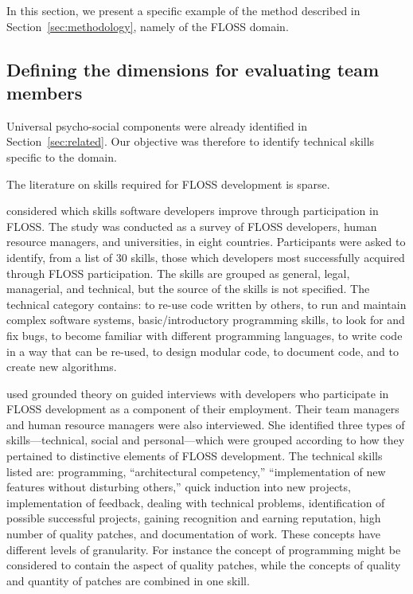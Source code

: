 In this section, we present a specific example of the method described in Section~\ref{sec:methodology}, namely of the FLOSS domain.

\subsection{Defining the dimensions for evaluating team members}

Universal psycho-social components were already identified in 
Section~\ref{sec:related}. Our objective was therefore to identify
technical skills specific to the domain.

The literature on skills required for FLOSS development is sparse.

\citet{david:2007:free} considered which skills software developers improve through participation in FLOSS. The study was conducted as a survey of FLOSS developers, human resource managers, and universities, in eight countries. Participants were asked to identify, from a list of 30 skills, those which developers most successfully acquired
through FLOSS participation. The skills are grouped as general, legal, managerial, and technical, but the source of the skills is not specified.
The technical category contains:
  to re-use code written by others,
  to run and maintain complex software systems,
  basic/introductory programming skills,
  to look for and fix bugs,
  to become familiar with different programming languages,
  to write code in a way that can be re-used,
  to design modular code,
  to document code, and
  to create new algorithms.

\cite{Kimmelmann13} used grounded theory on guided interviews with 
developers who participate in FLOSS development as a component of their
employment. Their team managers and human resource managers were also
interviewed. She identified three types of skills---technical,
social and personal---which were grouped according to how they
pertained to distinctive elements of FLOSS development. The technical
skills listed are:
programming, ``architectural competency,'' ``implementation of new features without disturbing others,'' quick induction into new projects, implementation of feedback, dealing with technical problems, identification of possible successful projects, gaining recognition and earning reputation, high number of quality patches, and documentation of work. 
These concepts have different levels of granularity. For instance
the concept of programming might be considered to contain the aspect
of quality patches, while the concepts of quality and quantity of patches are combined in one skill.

